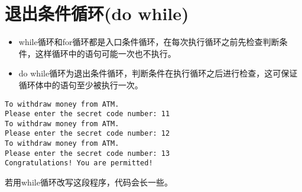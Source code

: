 \section{退出条件循环(do while)}
\begin{frame}[fragile]\ft{\secname}
\begin{itemize}
\item
while循环和for循环都是入口条件循环，在每次执行循环之前先检查判断条件，这样循环中的语句可能一次也不执行。\\[0.1in]
\item 
do while循环为退出条件循环，判断条件在执行循环之后进行检查，这可保证循环体中的语句至少被执行一次。
\end{itemize}
\end{frame}

\begin{frame}\ft{\secname}


\end{frame}

\begin{frame}[fragile]\ft{\secname}
 \begin{lstlisting}[backgroundcolor=\color{red!10}]
To withdraw money from ATM.
Please enter the secret code number: 11
To withdraw money from ATM. 
Please enter the secret code number: 12
To withdraw money from ATM. 
Please enter the secret code number: 13
Congratulations! You are permitted!
\end{lstlisting}
\end{frame}

\begin{frame}\ft{\secname}
若用while循环改写这段程序，代码会长一些。



\end{frame}



